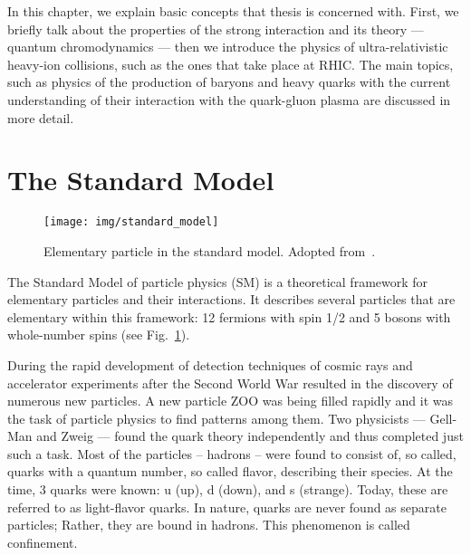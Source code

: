 In this chapter, we explain basic concepts that thesis is concerned with. First, we briefly talk about the properties of the strong interaction and its theory --- quantum chromodynamics --- then we introduce the physics of ultra-relativistic heavy-ion collisions, such as the ones that take place at RHIC\@. The main topics, such as physics of the production of baryons and heavy quarks with the current understanding of their interaction with the quark-gluon plasma are discussed in more detail.

\section{The Standard Model}

\begin{figure}[!htb]
\centering
\texttt{[image: img/standard\_model]}
\caption[Elementary particle in the standard model.]{\label{standard_model}Elementary particle in the standard model. Adopted from~\cite{standardModel}\@.}
\end{figure}

The Standard Model of particle physics (SM) is a theoretical framework for elementary particles and their interactions. It describes several particles that are elementary within this framework: 12 fermions with spin 1/2 and 5 bosons with whole-number spins (see Fig.\ \ref{standard_model})\@.

During the rapid development of detection techniques of cosmic rays and accelerator experiments after the Second World War resulted in the discovery of numerous new particles. A new particle ZOO was being filled rapidly and it was the task of particle physics to find patterns among them. Two physicists --- Gell-Man and Zweig --- found the quark theory independently and thus completed just such a task. Most of the particles -- hadrons -- were found to consist of, so called, quarks with a quantum number, so called flavor, describing their species. At the time, 3 quarks were known: u (up), d (down), and s (strange)\@. Today, these are referred to as light-flavor quarks. In nature, quarks are never found as separate particles; Rather, they are bound in hadrons. This phenomenon is called confinement.


